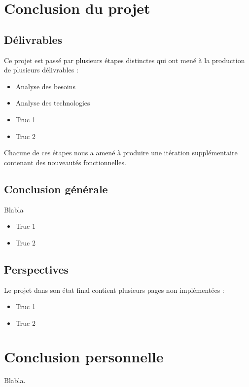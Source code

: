 
\section{Conclusion du projet}

	\subsection{Délivrables}

		Ce projet est passé par plusieurs étapes distinctes qui ont mené à la production de plusieurs délivrables :
		\begin{itemize}
			\item Analyse des besoins
			\item Analyse des technologies
			\item Truc 1
			\item Truc 2
		\end{itemize}
		Chacune de ces étapes nous a amené à produire une itération supplémentaire contenant des nouveautés fonctionnelles.

	\subsection{Conclusion générale}

		Blabla
		\begin{itemize}
			\item Truc 1
			\item Truc 2
		\end{itemize}
		

	\subsection{Perspectives}

		Le projet dans son état final contient plusieurs pages non implémentées :

		\begin{itemize}
			\item Truc 1
			\item Truc 2
		\end{itemize}


\section{Conclusion personnelle}

	Blabla.